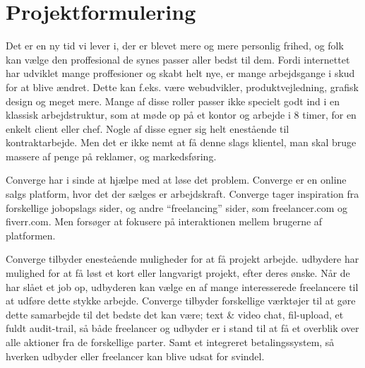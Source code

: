 \chapter{Projektformulering} %
\label{cha:Projektformulering}

Det er en ny tid vi lever i, der er blevet mere og mere personlig frihed, og folk kan vælge den proffesional de synes passer aller bedst til dem. Fordi internettet har udviklet mange proffesioner og skabt helt nye, er mange arbejdsgange i skud for at blive ændret. Dette kan f.eks. være webudvikler, produktvejledning, grafisk design og meget mere. Mange af disse roller passer ikke specielt godt ind i en klassisk arbejdstruktur, som at møde op på et kontor og arbejde i 8 timer, for en enkelt client eller chef. Nogle af disse egner sig helt enestående til kontraktarbejde. Men det er ikke nemt at få denne slags klientel, man skal bruge massere af penge på reklamer, og markedsføring.

Converge har i sinde at hjælpe med at løse det problem. Converge er en online salgs platform, hvor det der sælges er arbejdskraft. Converge tager inspiration fra forskellige jobopslags sider, og andre ``freelancing'' sider, som freelancer.com og fiverr.com. Men forsøger at fokusere på interaktionen mellem brugerne af platformen.

Converge tilbyder enesteående muligheder for at få projekt arbejde. udbydere har mulighed for at få løst et kort eller langvarigt projekt, efter deres ønske. Når de har slået et job op, udbyderen kan vælge en af mange interesserede freelancere til at udføre dette stykke arbejde. Converge tilbyder forskellige værktøjer til at gøre dette samarbejde til det bedste det kan være; text \& video chat, fil-upload, et fuldt audit-trail, så både freelancer og udbyder er i stand til at få et overblik over alle aktioner fra de forskellige parter. Samt et integreret betalingssystem, så hverken udbyder eller freelancer kan blive udsat for svindel. 

